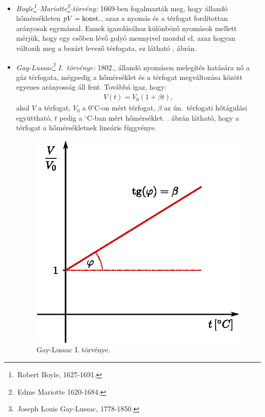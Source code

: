 \begin{itemize}
    \item \emph{Boyle\footnote{\,Robert Boyle, 1627-1691.}--Mariotte\footnote{\,Edme Mariotte 1620-1684.}-törvény:} 1669-ben fogalmazták meg, hogy állandó hőmérsékleten $pV = \textnormal{konst.}$, azaz a nyomás és a térfogat fordítottan arányosak egymással. Ennek igazolásához különböző nyomások mellett mérjük, hogy egy csőben lévő golyó mennyivel mozdul el, azaz hogyan változik meg a bezárt levező térfogata, ez látható . ábrán.
    \item \emph{Gay-Lussac\footnote{\,Joseph Louis Gay-Lussac, 1778-1850.} I.~törvénye:} 1802., állandó nyomáson melegítés hatására nő a gáz térfogata, mégpedig a hőmérséklet és a térfogat megváltozása között egyenes arányosság áll fent. Továbbá igaz, hogy:
    \begin{align}
        V(t) = V_0(1+\beta t),
    \end{align}
    ahol $V$ a térfogat, $V_0$ a $0^\circ$C-on mért térfogat, $\beta$ az ún.~térfogati hőtágulási együttható, $t$ pedig a $^\circ$C-ban mért hőmérséklet. . ábrán látható, hogy a térfogat a hőmérsékletnek lineáris függvénye. 
    \begin{figure}[htb]
    \centering
    \includegraphics{termo_1/termo_1_1.eps}
    \caption{Gay-Lussac I. törvénye.}

\end{figure}
\end{itemize}
